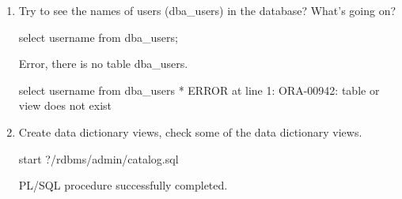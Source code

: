 \documentclass{article}
\begin{document}
\begin{enumerate}
\begin{itemize}
\begin{sqlshell}
                    select name from V$datafile;
                \end{sqlshell}
                \begin{messageshell}
NAME
--------------------------------------------------------------------------------
/opt/oracle/oradata/myinst/system01myinst.dbf
/opt/oracle/oradata/myinst/sysaux01.dbf
/opt/oracle/oradata/myinst/undotbs01.dbf
                \end{messageshell}
            \item Control file names
                \begin{sqlshell}
                    show parameters control_files;
                \end{sqlshell}
                \begin{messageshell}
NAME                                 TYPE        VALUE
------------------------------------ ----------- ------------------------------
control_files                        string      /opt/oracle/oradata/myinst/con
                                                 trol01.ctl
                \end{messageshell}
            \item Log file names
                \begin{sqlshell}
                    select member from v$logfile;
                \end{sqlshell}
                \begin{messageshell}
MEMBER
--------------------------------------------------------------------------------
/opt/oracle/oradata/myinst/myinst_log1a.log
/opt/oracle/oradata/myinst/myinst_log2a.log
                \end{messageshell}
        \end{itemize}

    \item Try to see the names of users (dba\_users) in the database? What's going on?
        \begin{sqlshell}
            select username from dba_users;
        \end{sqlshell}
        Error,  there is no table dba\_users.
        \begin{messageshell}
select username from dba_users
                     *
ERROR at line 1:
ORA-00942: table or view does not exist
        \end{messageshell}
    \item Create data dictionary views, check some of the data dictionary views.
        \begin{sqlshell}
            start ?/rdbms/admin/catalog.sql
         \end{sqlshell}   
         \begin{messageshell}
PL/SQL procedure successfully completed.



\end{messageshell}
\end{enumerate}
\end{document}
